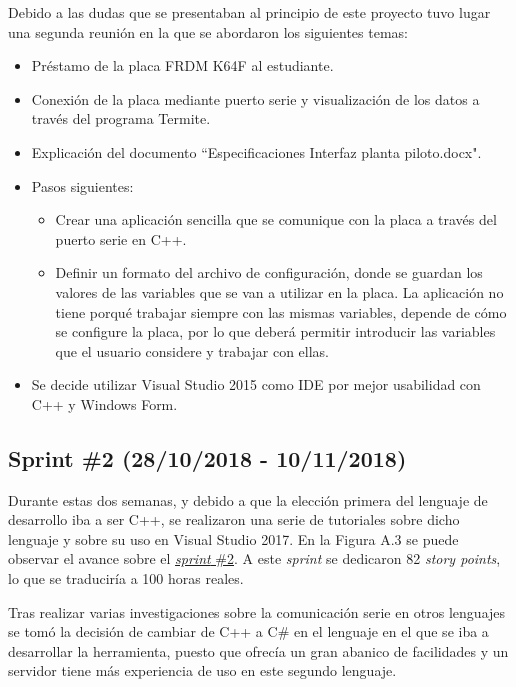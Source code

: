 
Debido a las dudas que se presentaban al principio de este proyecto tuvo lugar una segunda reunión en la que se abordaron los siguientes temas:
\begin{itemize}
	\item Préstamo de la placa FRDM K64F al estudiante.
	\item Conexión de la placa mediante puerto serie y visualización de los datos a través del programa Termite.
	\item Explicación del documento ``Especificaciones Interfaz planta piloto.docx".
	\item Pasos siguientes:
	\begin{itemize}
		\item Crear una aplicación sencilla que se comunique con la placa a través del puerto serie en C++.
		\item Definir un formato del archivo de configuración, donde se guardan los valores de las variables que se van a utilizar en la placa. La aplicación no tiene porqué trabajar siempre con las mismas variables, depende de cómo se configure la placa, por lo que deberá permitir introducir las variables que el usuario considere y trabajar con ellas.
	\end{itemize}
	\item Se decide utilizar Visual Studio 2015 como IDE por mejor usabilidad con C++ y Windows Form.
\end{itemize}

\subsection{Sprint \#2 (28/10/2018 - 10/11/2018)}

Durante estas dos semanas, y debido a que la elección primera del lenguaje de desarrollo iba a ser C++, se realizaron una serie de tutoriales sobre dicho lenguaje y sobre su uso en Visual Studio 2017. En la Figura A.3 se puede observar el avance sobre el \href{https://github.com/FranBurgos/TFG/milestone/3?closed=1}{\textit{sprint} \#2}. A este \textit{sprint} se dedicaron 82 \textit{story points}, lo que se traduciría a 100 horas reales.


Tras realizar varias investigaciones sobre la comunicación serie en otros lenguajes se tomó la decisión de cambiar de C++ a C\# en el lenguaje en el que se iba a desarrollar la herramienta, puesto que ofrecía un gran abanico de facilidades y un servidor tiene más experiencia de uso en este segundo lenguaje.


